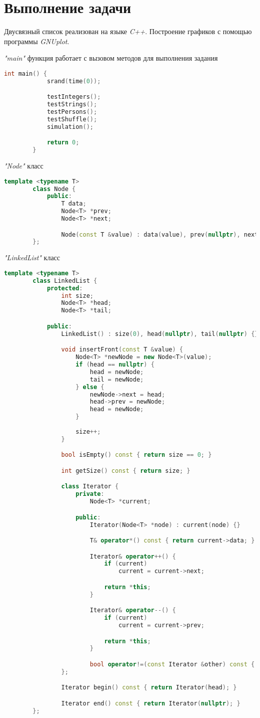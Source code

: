 \documentclass[12pt, a4paper]{report}
\begin{document}
	\section*{Выполнение задачи}
	Двусвязный список реализован на языке \textit{C++}. Построение графиков с помощью программы \textit{GNUplot}.

	\textit{"main"} функция работает с вызовом методов для выполнения задания
	\lstset{style=mystyle}
	\begin{lstlisting}[language=C++]
		int main() {
			srand(time(0));

			testIntegers();
			testStrings();
			testPersons();
			testShuffle();
			simulation();

			return 0;
		}
	\end{lstlisting}
	\par
	\textit{"Node"} класс
	\lstset{style=mystyle}
	\begin{lstlisting}[language=C++]
		template <typename T>
		class Node {
			public:
				T data;
				Node<T> *prev;
				Node<T> *next;

				Node(const T &value) : data(value), prev(nullptr), next(nullptr) {}
		};
	\end{lstlisting}
	\par
	\textit{"LinkedList"} класс
	\lstset{style=mystyle}
	\begin{lstlisting}[language=C++]
		template <typename T>
		class LinkedList {
			protected:
				int size;
				Node<T> *head;
				Node<T> *tail;

			public:
				LinkedList() : size(0), head(nullptr), tail(nullptr) {}

				void insertFront(const T &value) {
					Node<T> *newNode = new Node<T>(value);
					if (head == nullptr) {
						head = newNode;
						tail = newNode;
					} else {
						newNode->next = head;
						head->prev = newNode;
						head = newNode;
					}
					
					size++;
				}

				bool isEmpty() const { return size == 0; }

				int getSize() const { return size; }

				class Iterator {
					private:
						Node<T> *current;

					public:
						Iterator(Node<T> *node) : current(node) {}

						T& operator*() const { return current->data; }

						Iterator& operator++() {
							if (current)
								current = current->next;

							return *this;
						}

						Iterator& operator--() {
							if (current)
								current = current->prev;

							return *this;
						}

						bool operator!=(const Iterator &other) const { return current != other.current; }
				};

				Iterator begin() const { return Iterator(head); }

				Iterator end() const { return Iterator(nullptr); }
		};
	\end{lstlisting}
\end{document}
